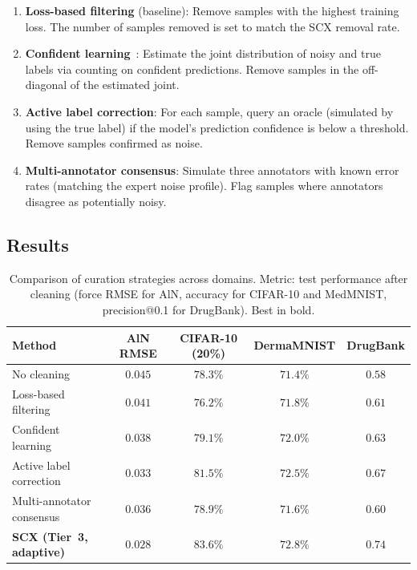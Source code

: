 \documentclass[11pt]{article}
\begin{document}
\begin{enumerate}
	\item \textbf{Loss-based filtering} (baseline): Remove samples with the highest training loss. The number of samples removed is set to match the SCX removal rate.
	\item \textbf{Confident learning}~\cite{northcutt2021}: Estimate the joint distribution of noisy and true labels via counting on confident predictions. Remove samples in the off-diagonal of the estimated joint.
	\item \textbf{Active label correction}: For each sample, query an oracle (simulated by using the true label) if the model's prediction confidence is below a threshold. Remove samples confirmed as noise.
	\item \textbf{Multi-annotator consensus}: Simulate three annotators with known error rates (matching the expert noise profile). Flag samples where annotators disagree as potentially noisy.
\end{enumerate}

\subsection{Results}

\begin{table}[h]
\centering
\caption{Comparison of curation strategies across domains. Metric: test performance after cleaning (force RMSE for AlN, accuracy for CIFAR-10 and MedMNIST, precision@0.1 for DrugBank). Best in bold.}
\label{tab:comparison}
\begin{tabular}{lcccc}
\hline
Method & AlN RMSE & CIFAR-10 (20\%) & DermaMNIST & DrugBank \\
\hline
No cleaning & $0.045$ & $78.3\%$ & $71.4\%$ & $0.58$ \\
Loss-based filtering & $0.041$ & $76.2\%$ & $71.8\%$ & $0.61$ \\
Confident learning~\cite{northcutt2021} & $0.038$ & $79.1\%$ & $72.0\%$ & $0.63$ \\
Active label correction & $0.033$ & $81.5\%$ & $72.5\%$ & $0.67$ \\
Multi-annotator consensus & $0.036$ & $78.9\%$ & $71.6\%$ & $0.60$ \\
\hline
\textbf{SCX (Tier~3, adaptive)} & $\mathbf{0.028}$ & $\mathbf{83.6\%}$ & $\mathbf{72.8\%}$ & $\mathbf{0.74}$ \\
\hline
\end{tabular}
\end{table}
\end{document}
